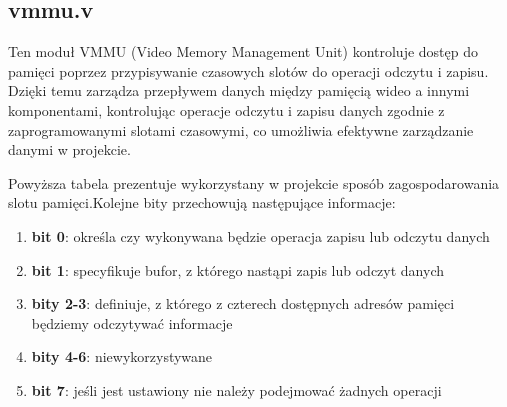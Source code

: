 \documentclass[12pt, a4paper]{article}
\begin{document}
\subsection{vmmu.v}
Ten moduł VMMU (Video Memory Management Unit) kontroluje dostęp do pamięci  poprzez przypisywanie czasowych slotów do operacji odczytu i zapisu. Dzięki temu zarządza przepływem danych między pamięcią wideo a innymi komponentami, kontrolując operacje odczytu i zapisu danych zgodnie z zaprogramowanymi slotami czasowymi, co umożliwia efektywne zarządzanie danymi w projekcie.
\begin{table}[htbp]
    \centering
    \caption{Struktura slotu pamięci}
\end{table}

Powyższa tabela prezentuje wykorzystany w projekcie sposób zagospodarowania slotu pamięci.Kolejne bity przechowują następujące informacje:

\begin{enumerate}
    \item \textbf{\fontsize{12}{10}\selectfont bit 0}: określa czy wykonywana będzie operacja zapisu lub odczytu danych
    \item \textbf{\fontsize{12}{10}\selectfont bit 1}: specyfikuje bufor, z którego nastąpi zapis lub odczyt danych
    \item \textbf{\fontsize{12}{10}\selectfont bity 2-3}: definiuje, z którego z czterech dostępnych adresów pamięci będziemy odczytywać informacje 
    \item \textbf{\fontsize{12}{10}\selectfont bity 4-6}: niewykorzystywane
    \item \textbf{\fontsize{12}{10}\selectfont bit 7}:  jeśli jest ustawiony nie należy podejmować żadnych operacji
\end{enumerate}
\end{document}
